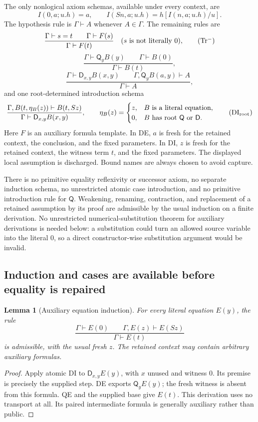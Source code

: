 \documentclass[11pt,letterpaper]{article}
\newtheorem{lemma}[theorem]{Lemma}
\theoremstyle{definition}\newtheorem{definition}[theorem]{Definition}
\theoremstyle{remark}\newtheorem{remark}[theorem]{Remark}
\newcommand{\D}{\mathsf D}
\newcommand{\Q}{\mathsf Q}
\begin{document}
The only nonlogical axiom schemas, available under every context, are
\[
 I(0,a;u.h)=a,\qquad
 I(Sn,a;u.h)=h[I(n,a;u.h)/u].
 \tag{I0,IS}
\]
The hypothesis rule is $\Gamma\vdash A$ whenever $A\in\Gamma$.
The remaining rules are
\[
 \frac{\Gamma\vdash s=t\qquad\Gamma\vdash F(s)}
      {\Gamma\vdash F(t)}
 \quad(s\text{ is not literally }0),
 \tag{Tr$^{-}$}\label{eq:restricted-tr}
\]
\[
 \frac{\Gamma\vdash\Q_y B(y)\qquad\Gamma\vdash B(0)}
      {\Gamma\vdash B(t)},
 \tag{QE}
\]
\[
 \frac{\Gamma\vdash\D_{x,y}B(x,y)\qquad
       \Gamma,\Q_yB(a,y)\vdash A}
      {\Gamma\vdash A},
 \tag{DE}
\]
and one root-determined introduction schema
\begin{equation}
 \frac{\Gamma,B(t,\eta_B(z))\vdash B(t,Sz)}
      {\Gamma\vdash\D_{x,y}B(x,y)},\qquad
 \eta_B(z)=
 \begin{cases}
 z,&B\text{ is a literal equation},\\
 0,&B\text{ has root }\Q\text{ or }\D.
 \end{cases}
 \tag{DI$_{\rm root}$}\label{eq:root-di}
\end{equation}
Here $F$ is an auxiliary formula template.  In DE, $a$ is fresh for the
retained context, the conclusion, and the fixed parameters.  In DI,
$z$ is fresh for the retained context, the witness term $t$, and the
fixed parameters.  The displayed local assumption is discharged.
Bound names are always chosen to avoid capture.

There is no primitive equality reflexivity or successor axiom, no
separate induction schema, no unrestricted atomic case introduction,
and no primitive introduction rule for $\Q$.  Weakening, renaming,
contraction, and replacement of a retained assumption by its proof are
admissible by the usual induction on a finite derivation.  No unrestricted
numerical-substitution theorem for auxiliary derivations is needed below:
a substitution could turn an allowed source variable into the literal
$0$, so a direct constructor-wise substitution argument would be invalid.

\subsection{Induction and cases are available before equality is repaired}

\begin{lemma}[Auxiliary equation induction]\label{lem:aux-ei}
For every literal equation $E(y)$, the rule
\[
 \frac{\Gamma\vdash E(0)\qquad
       \Gamma,E(z)\vdash E(Sz)}
      {\Gamma\vdash E(t)}
\]
is admissible, with the usual fresh $z$.  The retained context may contain
arbitrary auxiliary formulas.
\end{lemma}
\begin{proof}
Apply atomic DI to $\D_{x,y}E(y)$, with $x$ unused and witness $0$.
Its premise is precisely the supplied step.  DE exports $\Q_yE(y)$;
the fresh witness is absent from this formula.  QE and the supplied base
give $E(t)$.  This derivation uses no transport at all.  Its paired
intermediate formula is generally auxiliary rather than public.
\end{proof}
\end{document}
